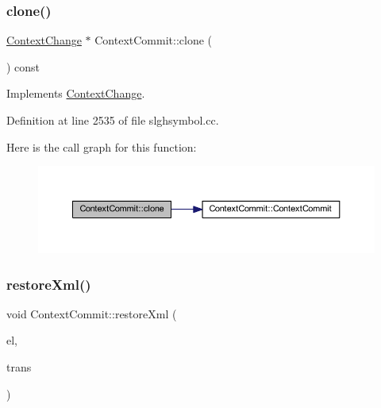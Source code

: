 \subsubsection{\texorpdfstring{clone()}{clone()}}
{\footnotesize\ttfamily \mbox{\hyperlink{class_context_change}{Context\+Change}} $\ast$ Context\+Commit\+::clone (\begin{DoxyParamCaption}\item[{void}]{ }\end{DoxyParamCaption}) const\hspace{0.3cm}{\ttfamily [virtual]}}



Implements \mbox{\hyperlink{class_context_change_ab1e858b15bc17c5dc375d5cda51dfeea}{Context\+Change}}.



Definition at line 2535 of file slghsymbol.\+cc.

Here is the call graph for this function\+:
\nopagebreak
\begin{figure}[H]
\begin{center}
\leavevmode
\includegraphics[width=350pt]{class_context_commit_aa3eed58d105a955678d30a2371fd7050_cgraph}
\end{center}
\end{figure}
\mbox{\label{class_context_commit_ae695eedc084ebe7a75bd7f4d205518d0}} 
\subsubsection{\texorpdfstring{restoreXml()}{restoreXml()}}
{\footnotesize\ttfamily void Context\+Commit\+::restore\+Xml (\begin{DoxyParamCaption}\item[{const \mbox{\hyperlink{class_element}{Element}} $\ast$}]{el,  }\item[{\mbox{\hyperlink{class_sleigh_base}{Sleigh\+Base}} $\ast$}]{trans }\end{DoxyParamCaption})\hspace{0.3cm}{\ttfamily [virtual]}}



